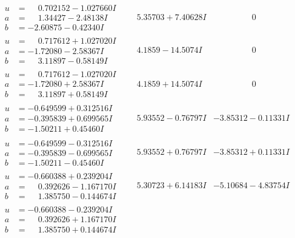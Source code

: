 \documentclass[1p]{elsarticle_modified}
\theoremstyle{definition}
\begin{document}
$$\begin{array}{c|c|c}
\begin{aligned}
u &= \phantom{-}0.702152 - 1.027660 I \\
a &= \phantom{-}1.34427 - 2.48138 I \\
b &= -2.60875 - 0.42340 I\end{aligned}
 & \phantom{-}5.35703 + 7.40628 I & \phantom{-0.000000 } 0 \\ \hline\begin{aligned}
u &= \phantom{-}0.717612 + 1.027020 I \\
a &= -1.72080 - 2.58367 I \\
b &= \phantom{-}3.11897 - 0.58149 I\end{aligned}
 & \phantom{-}4.1859 - 14.5074 I & \phantom{-0.000000 } 0 \\ \hline\begin{aligned}
u &= \phantom{-}0.717612 - 1.027020 I \\
a &= -1.72080 + 2.58367 I \\
b &= \phantom{-}3.11897 + 0.58149 I\end{aligned}
 & \phantom{-}4.1859 + 14.5074 I & \phantom{-0.000000 } 0 \\ \hline\begin{aligned}
u &= -0.649599 + 0.312516 I \\
a &= -0.395839 + 0.699565 I \\
b &= -1.50211 + 0.45460 I\end{aligned}
 & \phantom{-}5.93552 - 0.76797 I & -3.85312 - 0.11331 I \\ \hline\begin{aligned}
u &= -0.649599 - 0.312516 I \\
a &= -0.395839 - 0.699565 I \\
b &= -1.50211 - 0.45460 I\end{aligned}
 & \phantom{-}5.93552 + 0.76797 I & -3.85312 + 0.11331 I \\ \hline\begin{aligned}
u &= -0.660388 + 0.239204 I \\
a &= \phantom{-}0.392626 - 1.167170 I \\
b &= \phantom{-}1.385750 - 0.144674 I\end{aligned}
 & \phantom{-}5.30723 + 6.14183 I & -5.10684 - 4.83754 I \\ \hline\begin{aligned}
u &= -0.660388 - 0.239204 I \\
a &= \phantom{-}0.392626 + 1.167170 I \\
b &= \phantom{-}1.385750 + 0.144674 I\end{aligned}

\end{array}$$
\end{document}
